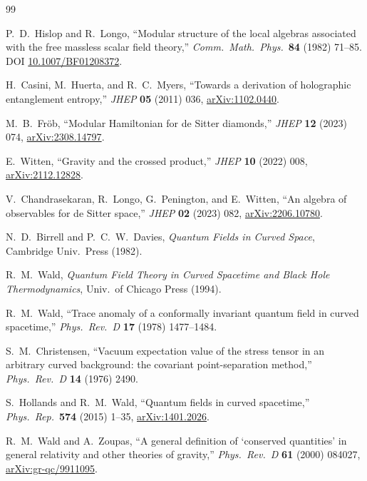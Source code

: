 \documentclass[11pt,a4paper]{article}
\theoremstyle{remark}
\begin{document}
\begin{thebibliography}{99}

P.~D.~Hislop and R.~Longo,
``Modular structure of the local algebras associated with the free
massless scalar field theory,''
\emph{Comm.\ Math.\ Phys.}\ \textbf{84} (1982) 71--85.
DOI \href{https://doi.org/10.1007/BF01208372}{10.1007/BF01208372}.

H.~Casini, M.~Huerta, and R.~C.~Myers,
``Towards a derivation of holographic entanglement entropy,''
\emph{JHEP} \textbf{05} (2011) 036,
\href{http://arxiv.org/abs/1102.0440}{arXiv:1102.0440}.

M.~B.~Fr\"ob,
``Modular Hamiltonian for de Sitter diamonds,''
\emph{JHEP} \textbf{12} (2023) 074,
\href{http://arxiv.org/abs/2308.14797}{arXiv:2308.14797}.

E.~Witten,
``Gravity and the crossed product,''
\emph{JHEP} \textbf{10} (2022) 008,
\href{http://arxiv.org/abs/2112.12828}{arXiv:2112.12828}.

V.~Chandrasekaran, R.~Longo, G.~Penington, and E.~Witten,
``An algebra of observables for de Sitter space,''
\emph{JHEP} \textbf{02} (2023) 082,
\href{http://arxiv.org/abs/2206.10780}{arXiv:2206.10780}.

N.~D.~Birrell and P.~C.~W.~Davies,
\emph{Quantum Fields in Curved Space}, Cambridge Univ.\ Press (1982).

R.~M.~Wald, \emph{Quantum Field Theory in Curved Spacetime and
Black Hole Thermodynamics}, Univ.\ of Chicago Press (1994).

R.~M.~Wald,
``Trace anomaly of a conformally invariant quantum field in curved spacetime,''
\emph{Phys.\ Rev.\ D} \textbf{17} (1978) 1477--1484.

S.~M.~Christensen,
``Vacuum expectation value of the stress tensor in an arbitrary curved
background: the covariant point-separation method,''
\emph{Phys.\ Rev.\ D} \textbf{14} (1976) 2490.

S.~Hollands and R.~M.~Wald,
``Quantum fields in curved spacetime,''
\emph{Phys.\ Rep.}\ \textbf{574} (2015) 1--35,
\href{http://arxiv.org/abs/1401.2026}{arXiv:1401.2026}.

R.~M.~Wald and A.~Zoupas,
``A general definition of `conserved quantities' in general relativity
and other theories of gravity,''
\emph{Phys.\ Rev.\ D} \textbf{61} (2000) 084027,
\href{http://arxiv.org/abs/gr-qc/9911095}{arXiv:gr-qc/9911095}.


\end{thebibliography}
\end{document}
